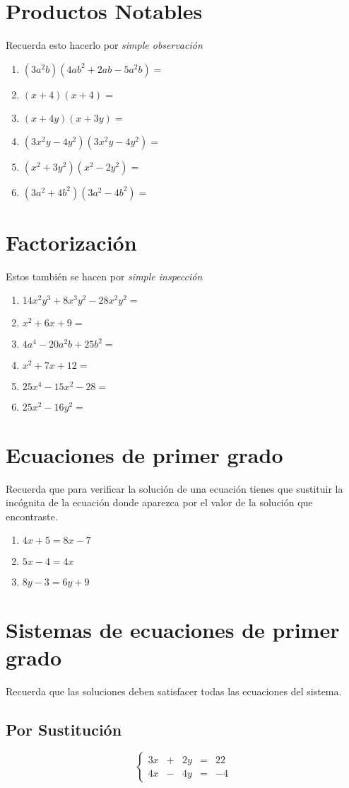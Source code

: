 \documentclass[11pt,twocolumn]{article} %
\begin{document}
\section{Productos Notables}
Recuerda esto hacerlo por \emph{simple observación}
\begin{enumerate}
\item $(3a^2b)(4ab^2+2ab-5a^2b)=$
\item $(x+4)(x+4)=$
\item $(x+4y)(x+3y)=$
\item $(3x^2y-4y^2)(3x^2y-4y^2)=$
\item $(x^2+3y^2)(x^2-2y^2)=$
\item $(3a^2+4b^2)(3a^2-4b^2)=$
\end{enumerate}
\section{Factorización}
Estos también se hacen por \emph{simple inspección}
\begin{enumerate}
\item $14x^2y^3+8x^3y^2-28x^2y^2=$
\item $x^2 + 6x + 9 =$
\item $4a^4 - 20a^2b + 25b^2 =$
\item $x^2 +7x + 12=$
\item $25x^4 - 15x^2 - 28=$
\item $25x^2-16y^2=$
\end{enumerate}
\section{Ecuaciones de primer grado}
Recuerda que para verificar la solución de una ecuación tienes que sustituir la incógnita de la ecuación donde aparezca por el valor de la solución que encontraste.
\begin{enumerate}
\item $4x+5=8x-7$
\item $5x-4=4x$
\item $8y-3=6y+9$
\end{enumerate}
\section{Sistemas de ecuaciones de primer grado}
Recuerda que las soluciones deben satisfacer todas las ecuaciones del sistema.
\subsection{Por Sustitución}
\begin{equation}
\left\lbrace
\begin{array}{rcrcr}
3x & + & 2y & = & 22\\
4x & - & 4y & = & -4
\end{array}
\right.
\end{equation}
\end{document}
